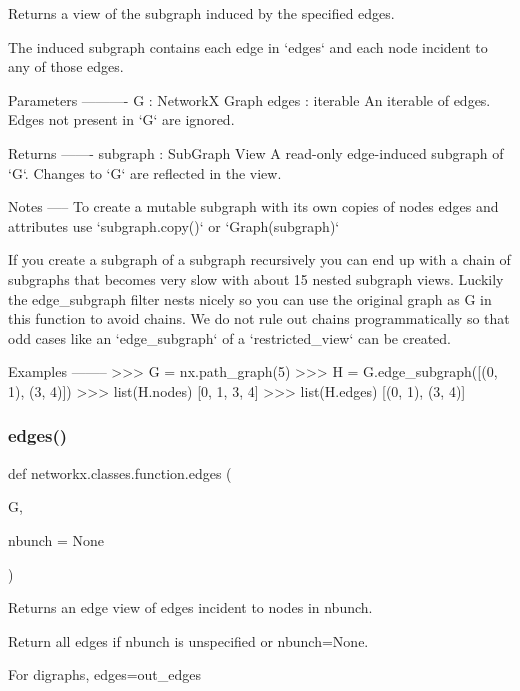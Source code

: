 \begin{DoxyVerb}Returns a view of the subgraph induced by the specified edges.

The induced subgraph contains each edge in `edges` and each
node incident to any of those edges.

Parameters
----------
G : NetworkX Graph
edges : iterable
    An iterable of edges. Edges not present in `G` are ignored.

Returns
-------
subgraph : SubGraph View
    A read-only edge-induced subgraph of `G`.
    Changes to `G` are reflected in the view.

Notes
-----
To create a mutable subgraph with its own copies of nodes
edges and attributes use `subgraph.copy()` or `Graph(subgraph)`

If you create a subgraph of a subgraph recursively you can end up
with a chain of subgraphs that becomes very slow with about 15
nested subgraph views. Luckily the edge_subgraph filter nests
nicely so you can use the original graph as G in this function
to avoid chains. We do not rule out chains programmatically so
that odd cases like an `edge_subgraph` of a `restricted_view`
can be created.

Examples
--------
>>> G = nx.path_graph(5)
>>> H = G.edge_subgraph([(0, 1), (3, 4)])
>>> list(H.nodes)
[0, 1, 3, 4]
>>> list(H.edges)
[(0, 1), (3, 4)]
\end{DoxyVerb}
 \mbox{\label{namespacenetworkx_1_1classes_1_1function_ab909d446533d66c2c860fd617b12baba}} 
\subsubsection{\texorpdfstring{edges()}{edges()}}
{\footnotesize\ttfamily def networkx.\+classes.\+function.\+edges (\begin{DoxyParamCaption}\item[{}]{G,  }\item[{}]{nbunch = {\ttfamily None} }\end{DoxyParamCaption})}

\begin{DoxyVerb}Returns an edge view of edges incident to nodes in nbunch.

Return all edges if nbunch is unspecified or nbunch=None.

For digraphs, edges=out_edges
\end{DoxyVerb}
 \mbox{\label{namespacenetworkx_1_1classes_1_1function_a0e337cbcfb1c1f634abeec979d6eacbe}} 
